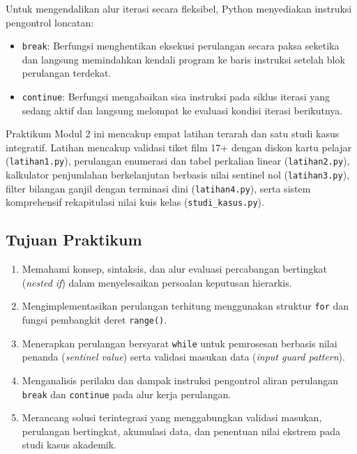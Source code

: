 \documentclass[12pt,a4paper]{article}
\begin{document}
Untuk mengendalikan alur iterasi secara fleksibel, Python menyediakan instruksi pengontrol loncatan:
\begin{itemize}
    \item \texttt{break}: Berfungsi menghentikan eksekusi perulangan secara paksa seketika dan langsung memindahkan kendali program ke baris instruksi setelah blok perulangan terdekat.
    \item \texttt{continue}: Berfungsi mengabaikan sisa instruksi pada siklus iterasi yang sedang aktif dan langsung melompat ke evaluasi kondisi iterasi berikutnya.
\end{itemize}

Praktikum Modul 2 ini mencakup empat latihan terarah dan satu studi kasus integratif. Latihan mencakup validasi tiket film 17+ dengan diskon kartu pelajar (\texttt{latihan1.py}), perulangan enumerasi dan tabel perkalian linear (\texttt{latihan2.py}), kalkulator penjumlahan berkelanjutan berbasis nilai sentinel nol (\texttt{latihan3.py}), filter bilangan ganjil dengan terminasi dini (\texttt{latihan4.py}), serta sistem komprehensif rekapitulasi nilai kuis kelas (\texttt{studi\_kasus.py}).

\subsection{Tujuan Praktikum}
\begin{enumerate}
    \item Memahami konsep, sintaksis, dan alur evaluasi percabangan bertingkat (\textit{nested if}) dalam menyelesaikan persoalan keputusan hierarkis.
    \item Mengimplementasikan perulangan terhitung menggunakan struktur \texttt{for} dan fungsi pembangkit deret \texttt{range()}.
    \item Menerapkan perulangan bersyarat \texttt{while} untuk pemrosesan berbasis nilai penanda (\textit{sentinel value}) serta validasi masukan data (\textit{input guard pattern}).
    \item Menganalisis perilaku dan dampak instruksi pengontrol aliran perulangan \texttt{break} dan \texttt{continue} pada alur kerja perulangan.
    \item Merancang solusi terintegrasi yang menggabungkan validasi masukan, perulangan bertingkat, akumulasi data, dan penentuan nilai ekstrem pada studi kasus akademik.
\end{enumerate}

\end{document}
